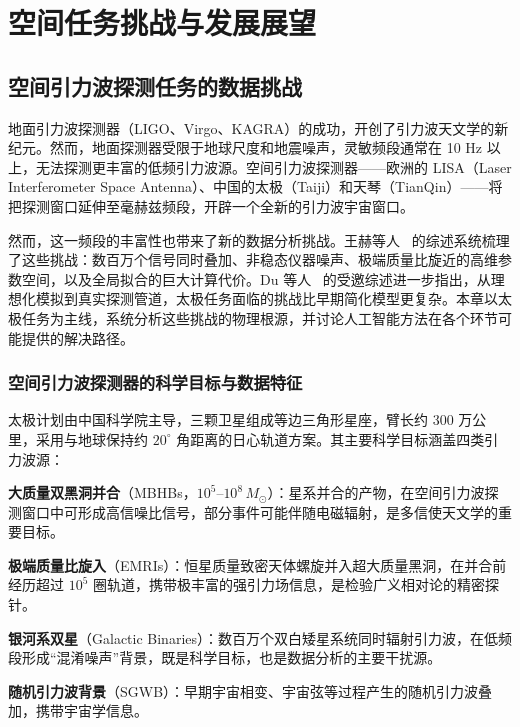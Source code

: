 \pagestyle{mystyle}

\part{空间任务挑战与发展展望}

\renewcommand{\parttitle}{空间任务挑战与发展展望}

\chapter{空间引力波探测任务的数据挑战}

地面引力波探测器（LIGO、Virgo、KAGRA）的成功，开创了引力波天文学的新纪元。然而，地面探测器受限于地球尺度和地震噪声，灵敏频段通常在 10 Hz 以上，无法探测更丰富的低频引力波源。空间引力波探测器——欧洲的 LISA（Laser Interferometer Space Antenna）、中国的太极（Taiji）和天琴（TianQin）——将把探测窗口延伸至毫赫兹频段，开辟一个全新的引力波宇宙窗口。

然而，这一频段的丰富性也带来了新的数据分析挑战。王赫等人~\cite{wang2024challenges} 的综述系统梳理了这些挑战：数百万个信号同时叠加、非稳态仪器噪声、极端质量比旋近的高维参数空间，以及全局拟合的巨大计算代价。Du 等人~\cite{du2026taiji} 的受邀综述进一步指出，从理想化模拟到真实探测管道，太极任务面临的挑战比早期简化模型更复杂。本章以太极任务为主线，系统分析这些挑战的物理根源，并讨论人工智能方法在各个环节可能提供的解决路径。

\section{空间引力波探测器的科学目标与数据特征}

太极计划由中国科学院主导，三颗卫星组成等边三角形星座，臂长约 300 万公里，采用与地球保持约 $20^\circ$ 角距离的日心轨道方案。其主要科学目标涵盖四类引力波源：

\textbf{大质量双黑洞并合}（MBHBs，$10^5$--$10^8\,M_\odot$）：星系并合的产物，在空间引力波探测窗口中可形成高信噪比信号，部分事件可能伴随电磁辐射，是多信使天文学的重要目标。

\textbf{极端质量比旋入}（EMRIs）：恒星质量致密天体螺旋并入超大质量黑洞，在并合前经历超过 $10^5$ 圈轨道，携带极丰富的强引力场信息，是检验广义相对论的精密探针。

\textbf{银河系双星}（Galactic Binaries）：数百万个双白矮星系统同时辐射引力波，在低频段形成“混淆噪声”背景，既是科学目标，也是数据分析的主要干扰源。

\textbf{随机引力波背景}（SGWB）：早期宇宙相变、宇宙弦等过程产生的随机引力波叠加，携带宇宙学信息。

